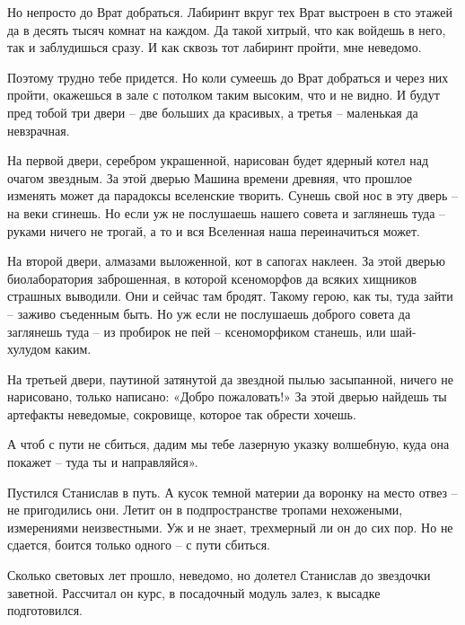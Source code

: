 \documentclass[ebook,oneside,final,openright]{memoir}
\begin{document}
\par
Но непросто до Врат добраться. Лабиринт вкруг тех Врат выстроен в сто этажей да в десять тысяч комнат на каждом. Да такой хитрый, что как войдешь в него, так и заблудишься сразу. И как сквозь тот лабиринт пройти, мне неведомо.\par
\par
Поэтому трудно тебе придется. Но коли сумеешь до Врат добраться и через них пройти, окажешься в зале с потолком таким высоким, что и не видно. И будут пред тобой три двери – две больших да красивых, а третья – маленькая да невзрачная.\par
\par
На первой двери, серебром украшенной, нарисован будет ядерный котел над очагом звездным. За этой дверью Машина времени древняя, что прошлое изменять может да парадоксы вселенские творить. Сунешь свой нос в эту дверь – на веки сгинешь. Но если уж не послушаешь нашего совета и заглянешь туда – руками ничего не трогай, а то и вся Вселенная наша переиначиться может.\par
\par
На второй двери, алмазами выложенной, кот в сапогах наклеен. За этой дверью биолаборатория заброшенная, в которой ксеноморфов да всяких хищников страшных выводили. Они и сейчас там бродят. Такому герою, как ты, туда зайти – заживо съеденным быть. Но уж если не послушаешь доброго совета да заглянешь туда – из пробирок не пей – ксеноморфиком станешь, или шай-хулудом каким.\par
\par
На третьей двери, паутиной затянутой да звездной пылью засыпанной, ничего не нарисовано, только написано: «Добро пожаловать!» За этой дверью найдешь ты артефакты неведомые, сокровище, которое так обрести хочешь.\par
\par
А чтоб с пути не сбиться, дадим мы тебе лазерную указку волшебную, куда она покажет – туда ты и направляйся».\par
\par
Пустился Станислав в путь. А кусок темной материи да воронку на место отвез – не пригодились они. Летит он в подпространстве тропами нехожеными, измерениями неизвестными. Уж и не знает, трехмерный ли он до сих пор. Но не сдается, боится только одного – с пути сбиться.\par
\par
Сколько световых лет прошло, неведомо, но долетел Станислав до звездочки заветной. Рассчитал он курс, в посадочный модуль залез, к высадке подготовился.\par
\end{document}
